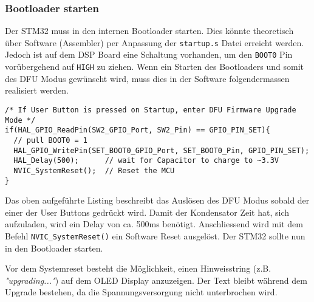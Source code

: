 \subsubsection{Bootloader starten}
\label{sec:Enter_DFU}

Der STM32 muss in den internen Bootloader starten. Dies könnte theoretisch über Software (Assembler) per Anpassung der \texttt{startup.s} Datei erreicht werden.
Jedoch ist auf dem DSP Board eine Schaltung vorhanden, um den \texttt{BOOT0} Pin vorübergehend auf \texttt{HIGH} zu ziehen.
Wenn ein Starten des Bootloaders und somit des DFU Modus gewünscht wird, muss dies in der Software folgendermassen realisiert werden.

\begin{lstlisting}[style=Cuvision,caption={Starten des Bootloaders durch CPU Reset}]
/* If User Button is pressed on Startup, enter DFU Firmware Upgrade Mode */
if(HAL_GPIO_ReadPin(SW2_GPIO_Port, SW2_Pin) == GPIO_PIN_SET){
  // pull BOOT0 = 1
  HAL_GPIO_WritePin(SET_BOOT0_GPIO_Port, SET_BOOT0_Pin, GPIO_PIN_SET);
  HAL_Delay(500);      // wait for Capacitor to charge to ~3.3V
  NVIC_SystemReset();  // Reset the MCU
}
\end{lstlisting}

Das oben aufgeführte Listing beschreibt das Auslösen des DFU Modus sobald der einer der User Buttons gedrückt wird.
Damit der Kondensator Zeit hat, sich aufzuladen, wird ein Delay von ca. 500ms benötigt.
Anschliessend wird mit dem Befehl \texttt{NVIC\_SystemReset()} ein Software Reset ausgelöst.
Der STM32 sollte nun in den Bootloader starten.

Vor dem Systemreset besteht die Möglichkeit, einen Hinweisstring (z.B. \textit{"upgrading..."}) auf dem OLED Display anzuzeigen.
Der Text bleibt während dem Upgrade bestehen, da die Spannungsversorgung nicht unterbrochen wird.



